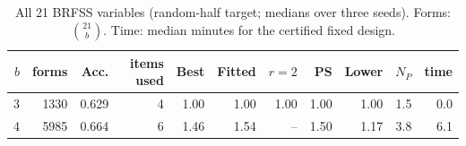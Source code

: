 \begin{table}[h]
\centering
\caption{All 21 BRFSS variables (random-half target; medians over three seeds). Forms: $\binom{21}b$. Time: median minutes for the certified fixed design.}
\label{tab:scale}
\small
\begin{tabular}{rrrrrrrrrrr}
\toprule
$b$ & forms & Acc. & items used & Best & Fitted & $r{=}2$ & PS & Lower & $N_P$ & time \\
\midrule
3 & 1330 & 0.629 & 4 & 1.00 & 1.00 & 1.00 & 1.00 & 1.00 & 1.5 & 0.0 \\
4 & 5985 & 0.664 & 6 & 1.46 & 1.54 & -- & 1.50 & 1.17 & 3.8 & 6.1 \\
\bottomrule
\end{tabular}
\end{table}
